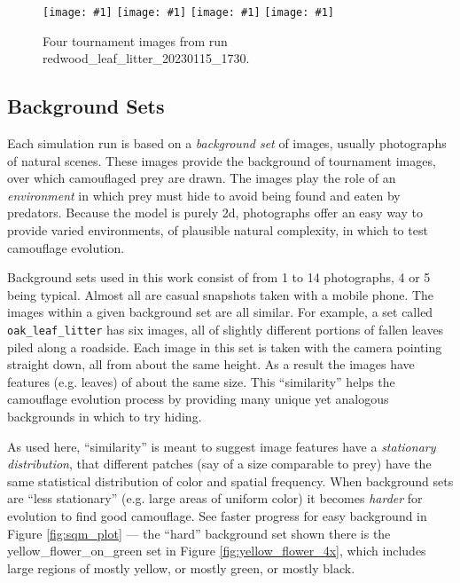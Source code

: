 \documentclass[letterpaper]{article}
\newcommand{\jargon}[1]{\textit{#1}}
\newcommand{\runID}{\footnotesize}
\newcommand{\igfour}[1]{\texttt{[image: \#1]}}
\newcommand{\stt}[1]{{\small \texttt{#1}}}
\begin{document}
\begin{figure}[t]
    \igfour{20230116_step_5868.png}
    \hfill
    \igfour{20230116_step_6057.png}
    \hfill
    \igfour{20230116_step_6347.png}
    \hfill
    \igfour{20230116_step_6814.png}
    \caption{Four tournament images from run {\runID redwood\_leaf\_litter\_20230115\_1730}.}
    \label{fig:redwood_leaf_litter_4x}
\end{figure}

\subsection{Background Sets}
\label{subsec:background_sets}
Each simulation run is based on a \jargon{background set} of images, usually photographs of natural scenes. These images provide the background of tournament images, over which camouflaged prey are drawn. The images play the role of an \jargon{environment} in which prey must hide to avoid being found and eaten by predators. Because the model is purely 2d, photographs offer an easy way to provide varied environments, of plausible natural complexity, in which to test camouflage evolution.
\par
Background sets used in this work consist of from 1 to 14 photographs, 4 or 5 being typical. Almost all are casual snapshots taken with a mobile phone. The images within a given background set are all similar. For example, a set called \stt{oak\_leaf\_litter} has six images, all of slightly different portions of fallen leaves piled along a roadside. Each image in this set is taken with the camera pointing straight down, all from about the same height. As a result the images have features (e.g. leaves) of about the same size. This “similarity” helps the camouflage evolution process by providing many unique yet analogous backgrounds in which to try hiding.
\par
As used here, “similarity” is meant to suggest image features have a \jargon{stationary distribution}, that different patches (say of a size comparable to prey) have the same statistical distribution of color and spatial frequency. When background sets are “less stationary” (e.g. large areas of uniform color) it becomes \jargon{harder} for evolution to find good camouflage. See faster progress for easy background in Figure \ref{fig:sqm_plot} — the “hard” background set shown there is the yellow\_flower\_on\_green set in Figure \ref{fig:yellow_flower_4x}, which includes large regions of mostly yellow, or mostly green, or mostly black.
\par
\end{document}
